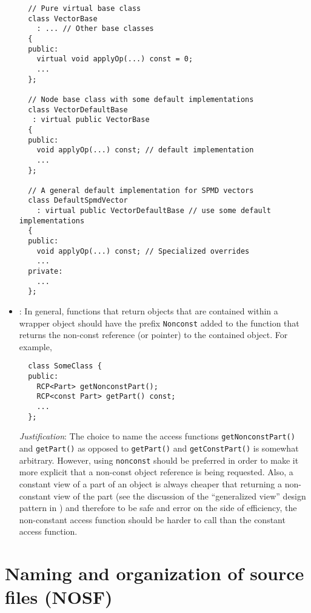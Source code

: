 \begin{itemize}
{\small\begin{verbatim}
  // Pure virtual base class 
  class VectorBase
    : ... // Other base classes
  {
  public:
    virtual void applyOp(...) const = 0;
    ...
  };

  // Node base class with some default implementations
  class VectorDefaultBase
   : virtual public VectorBase
  {
  public:
    void applyOp(...) const; // default implementation
    ...
  };

  // A general default implementation for SPMD vectors
  class DefaultSpmdVector
    : virtual public VectorDefaultBase // use some default implementations
  {
  public:
    void applyOp(...) const; // Specialized overrides
    ...
  private:
    ...
  };
\end{verbatim}}


{}\item\NCConstNonconstAccessFunctionName: In general, functions that return
objects that are contained within a wrapper object should have the prefix
{}\texttt{Nonconst} added to the function that returns the non-const reference
(or pointer) to the contained object.  For example,

{\small\begin{verbatim}
  class SomeClass {
  public:
    RCP<Part> getNonconstPart();
    RCP<const Part> getPart() const;
    ...
  };
\end{verbatim}}

{}\textit{Justification}: The choice to name the access functions
{}\texttt{getNonconstPart()} and {}\texttt{getPart()} as opposed to
{}\texttt{getPart()} and {}\texttt{getConstPart()} is somewhat arbitrary.
However, using {}\texttt{nonconst} should be preferred in order to make it
more explicit that a non-const object reference is being requested.  Also, a
constant view of a part of an object is always cheaper that returning a
non-constant view of the part (see the discussion of the ``generalized view''
design pattern in {}\cite{TeuchosMemoryManagementGuide}) and therefore to be
safe and error on the side of efficiency, the non-constant access function
should be harder to call than the constant access function.


\end{itemize}


%
\section{Naming and organization of source files (NOSF)}
\label{sec:NOSF}
%

